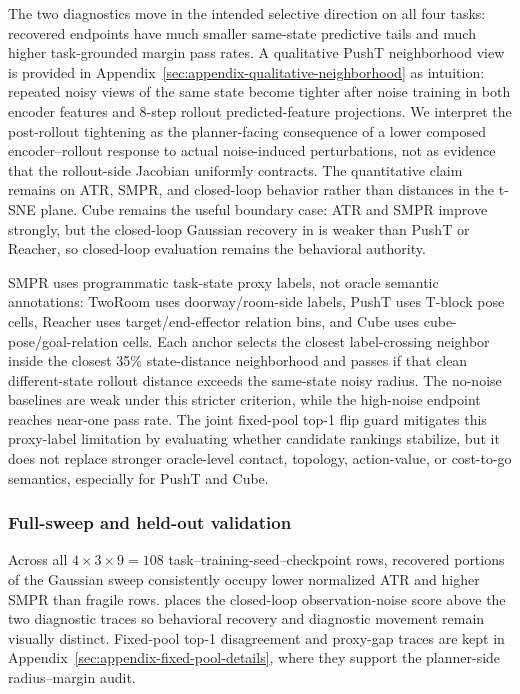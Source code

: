 \documentclass[10pt]{article}
\begin{document}
The two diagnostics move in the intended selective direction on all four tasks: recovered endpoints have much smaller same-state predictive tails and much higher task-grounded margin pass rates. A qualitative PushT neighborhood view is provided in Appendix~\ref{sec:appendix-qualitative-neighborhood} as intuition: repeated noisy views of the same state become tighter after noise training in both encoder features and 8-step rollout predicted-feature projections. We interpret the post-rollout tightening as the planner-facing consequence of a lower composed encoder--rollout response to actual noise-induced perturbations, not as evidence that the rollout-side Jacobian uniformly contracts. The quantitative claim remains on ATR, SMPR, and closed-loop behavior rather than distances in the t-SNE plane. Cube remains the useful boundary case: ATR and SMPR improve strongly, but the closed-loop Gaussian recovery in  is weaker than PushT or Reacher, so closed-loop evaluation remains the behavioral authority.

SMPR uses programmatic task-state proxy labels, not oracle semantic annotations: TwoRoom uses doorway/room-side labels, PushT uses T-block pose cells, Reacher uses target/end-effector relation bins, and Cube uses cube-pose/goal-relation cells. Each anchor selects the closest label-crossing neighbor inside the closest 35\% state-distance neighborhood and passes if that clean different-state rollout distance exceeds the same-state noisy radius. The no-noise baselines are weak under this stricter criterion, while the high-noise endpoint reaches near-one pass rate. The joint fixed-pool top-1 flip guard mitigates this proxy-label limitation by evaluating whether candidate rankings stabilize, but it does not replace stronger oracle-level contact, topology, action-value, or cost-to-go semantics, especially for PushT and Cube.

\subsubsection{Full-sweep and held-out validation}\label{sec:exp-full-sweep-diagnostics}

Across all $4\times3\times9=108$ task--training-seed--checkpoint rows, recovered portions of the Gaussian sweep consistently occupy lower normalized ATR and higher SMPR than fragile rows.  places the closed-loop observation-noise score above the two diagnostic traces so behavioral recovery and diagnostic movement remain visually distinct. Fixed-pool top-1 disagreement and proxy-gap traces are kept in Appendix~\ref{sec:appendix-fixed-pool-details}, where they support the planner-side radius--margin audit.
\end{document}
